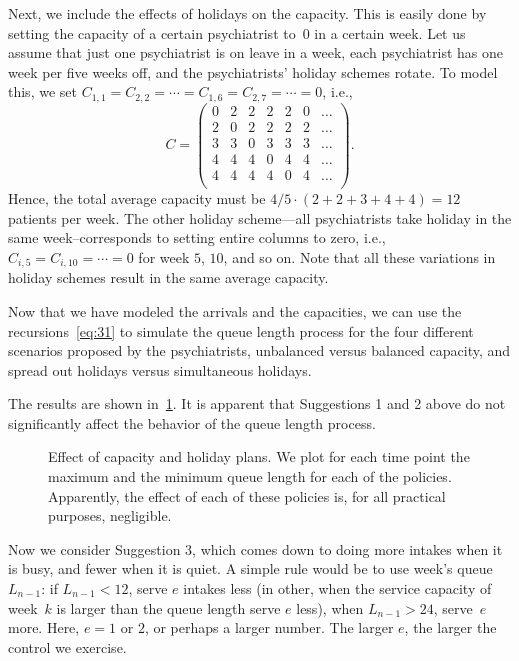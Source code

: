 Next, we include the effects of holidays on the capacity. This is
easily done by setting the capacity of a certain psychiatrist to~$0$ in
a certain week. Let us assume that just one psychiatrist is on leave in
a week, each psychiatrist has one week per five weeks off, and the
psychiatrists' holiday schemes rotate. To model this, we set
$C_{1,1}=C_{2,2}=\cdots=C_{1,6}=C_{2,7} =\cdots = 0$, i.e.,
\begin{equation*}
C = 
 \begin{pmatrix}
 0 & 2 & 2 & 2 & 2 & 0 & \ldots \\
 2 & 0 & 2 & 2 & 2 & 2 & \ldots\\
 3 & 3 & 0 & 3 & 3 & 3 & \ldots\\
 4 & 4 & 4 & 0 & 4 & 4 & \ldots\\
 4 & 4 & 4 & 4 & 0 & 4 & \ldots\\
 \end{pmatrix}.
\end{equation*}
Hence, the total average capacity must be $4/5 \cdot (2+2+3+4+4) = 12$
patients per week. The other holiday scheme---all psychiatrists take
holiday in the same week--corresponds to setting entire columns to
zero, i.e., $C_{i,5}=C_{i,10}=\cdots=0$ for week $5$, $10$, and so
on. Note that all these variations in holiday schemes result in the
same average capacity.

Now that we have modeled the arrivals and the capacities, we can use the recursions~\cref{eq:31} to simulate the queue length process for the four different scenarios proposed by the psychiatrists, unbalanced versus balanced capacity, and spread out holidays versus simultaneous holidays.

The results are shown in~\cref{fig:balanced}.
It is apparent that Suggestions 1 and 2 above do not significantly affect the behavior of the queue length process.



\begin{figure}[ht]
 \centering
 
\caption{ Effect of capacity and holiday plans.
 We plot for each time point the maximum and the minimum queue length for each of the policies.
 Apparently, the effect of each of these policies is, for all practical purposes, negligible.
}
\label{fig:balanced}
\end{figure}


Now we consider Suggestion 3, which comes down to doing more intakes when it is busy, and fewer when it is quiet.
A simple rule would be to use week's queue $L_{n-1}$: if $L_{n-1}<12$, serve $e$ intakes less (in other, when the service capacity of week~$k$ is larger than the queue length serve $e$ less), when $L_{n-1}>24$, serve~$e$ more.
Here, $e=1$ or $2$, or perhaps a larger number.
The larger $e$, the larger the control we exercise.

